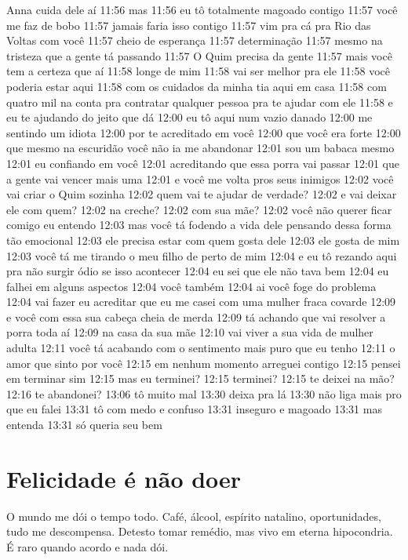 {{Anna cuida dele
aí 11:56 mas 11:56 eu tô totalmente magoado contigo 11:57 você me faz de
bobo 11:57 jamais faria isso contigo 11:57 vim pra cá pra Rio das Voltas
com você 11:57 cheio de esperança 11:57 determinação 11:57 mesmo na
tristeza que a gente tá passando 11:57 O Quim precisa da gente 11:57
mais você tem a certeza que aí 11:58 longe de mim 11:58 vai ser melhor
pra ele 11:58 você poderia estar aqui 11:58 com os cuidados da minha tia
aqui em casa 11:58 com quatro mil na conta pra contratar qualquer pessoa
pra te ajudar com ele 11:58 e eu te ajudando do jeito que dá 12:00 eu tô
aqui num vazio danado 12:00 me sentindo um idiota 12:00 por te
acreditado em você 12:00 que você era forte 12:00 que mesmo na escuridão
você não ia me abandonar 12:01 sou um babaca mesmo 12:01 eu confiando em
você 12:01 acreditando que essa porra vai passar 12:01 que a gente vai
vencer mais uma 12:01 e você me volta pros seus inimigos 12:02 você vai
criar o Quim sozinha 12:02 quem vai te ajudar de verdade? 12:02 e vai
deixar ele com quem? 12:02 na creche? 12:02 com sua mãe? 12:02 você não
querer ficar comigo eu entendo 12:03 mas você tá fodendo a vida dele
pensando dessa forma tão emocional 12:03 ele precisa estar com quem
gosta dele 12:03 ele gosta de mim 12:03 você tá me tirando o meu filho
de perto de mim 12:04 e eu tô rezando aqui pra não surgir ódio se isso
acontecer 12:04 eu sei que ele não tava bem 12:04 eu falhei em alguns
aspectos 12:04 você também 12:04 ai você foge do problema 12:04 vai
fazer eu acreditar que eu me casei com uma mulher fraca covarde 12:09 e
você com essa sua cabeça cheia de merda 12:09 tá achando que vai
resolver a porra toda aí 12:09 na casa da sua mãe 12:10 vai viver a sua
vida de mulher adulta 12:11 você tá acabando com o sentimento mais puro
que eu tenho 12:11 o amor que sinto por você 12:15 em nenhum momento
arreguei contigo 12:15 pensei em terminar sim 12:15 mas eu terminei?
12:15 terminei? 12:15 te deixei na mão? 12:16 te abandonei? 13:06 tô
muito mal 13:30 deixa pra lá 13:30 não liga mais pro que eu falei 13:31
tô com medo e confuso 13:31 inseguro e magoado 13:31 mas entenda 13:31
só queria seu bem

\chapter{Felicidade é não doer}\label{felicidade-uxe9-nuxe3o-doer}

O mundo me dói o tempo todo. Café, álcool, espírito natalino,
oportunidades, tudo me descompensa. Detesto tomar remédio, mas vivo em
eterna hipocondria. É raro quando acordo e nada dói.

}}

